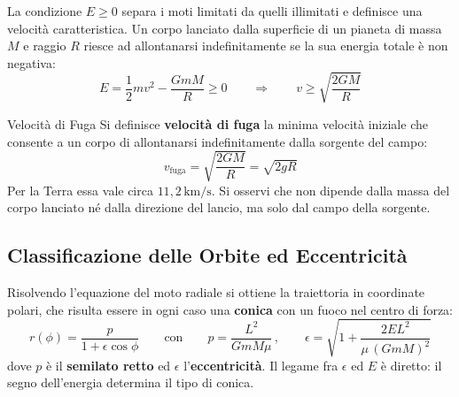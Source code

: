 La condizione $E \geq 0$ separa i moti limitati da quelli illimitati e definisce una velocità caratteristica. Un corpo lanciato dalla superficie di un pianeta di massa $M$ e raggio $R$ riesce ad allontanarsi indefinitamente se la sua energia totale è non negativa:
\begin{equation}
    E = \frac{1}{2} m v^2 - \frac{GmM}{R} \geq 0
    \qquad \Longrightarrow \qquad
    v \geq \sqrt{\frac{2GM}{R}}
\end{equation}

\begin{definizione}{Velocità di Fuga}
Si definisce \textbf{velocità di fuga} la minima velocità iniziale che consente a un corpo di allontanarsi indefinitamente dalla sorgente del campo:
\begin{equation}
    v_{\text{fuga}} = \sqrt{\frac{2GM}{R}} = \sqrt{2gR}
\end{equation}
Per la Terra essa vale circa $11{,}2 \, \mathrm{km/s}$. Si osservi che non dipende dalla massa del corpo lanciato né dalla direzione del lancio, ma solo dal campo della sorgente.
\end{definizione}

\subsection{Classificazione delle Orbite ed Eccentricità}

Risolvendo l'equazione del moto radiale si ottiene la traiettoria in coordinate polari, che risulta essere in ogni caso una \textbf{conica} con un fuoco nel centro di forza:
\begin{equation}
    r(\phi) = \frac{p}{1 + \epsilon \cos\phi}
    \qquad \text{con} \qquad
    p = \frac{L^2}{G m M \mu}
    \, , \qquad
    \epsilon = \sqrt{1 + \frac{2 E L^2}{\mu \,(G m M)^2}}
\end{equation}
dove $p$ è il \textbf{semilato retto} ed $\epsilon$ l'\textbf{eccentricità}. Il legame fra $\epsilon$ ed $E$ è diretto: il segno dell'energia determina il tipo di conica.

